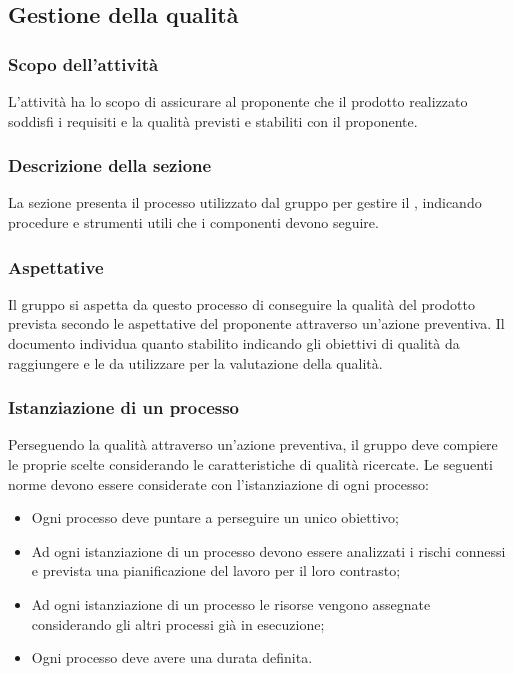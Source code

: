 \subsection{Gestione della qualità}
\subsubsection{Scopo dell'attività} \label{PSup_GestioneQualità_Scopo}
L'attività ha lo scopo di assicurare al proponente che il prodotto realizzato soddisfi i requisiti e la qualità previsti e stabiliti con il proponente.

\subsubsection{Descrizione della sezione} 
La sezione presenta il processo utilizzato dal gruppo per gestire il , indicando procedure e strumenti utili che i componenti devono seguire.

\subsubsection{Aspettative}
Il gruppo si aspetta da questo processo di conseguire la qualità del prodotto prevista secondo le aspettative del proponente attraverso un'azione preventiva. Il documento  individua quanto stabilito indicando gli obiettivi di qualità da raggiungere e le  da utilizzare per la valutazione della qualità.

\subsubsection{Istanziazione di un processo}
Perseguendo la qualità attraverso un'azione preventiva, il gruppo deve compiere le proprie scelte considerando le caratteristiche di qualità ricercate. 
Le seguenti norme devono essere considerate con l'istanziazione di ogni processo:
\begin{itemize}
	\item Ogni processo deve puntare a perseguire un unico obiettivo;
	\item Ad ogni istanziazione di un processo devono essere analizzati i rischi connessi e prevista una pianificazione del lavoro per il loro contrasto;
	\item Ad ogni istanziazione di un processo le risorse vengono assegnate considerando gli altri processi già in esecuzione;
	\item Ogni processo deve avere una durata definita.
\end{itemize}


